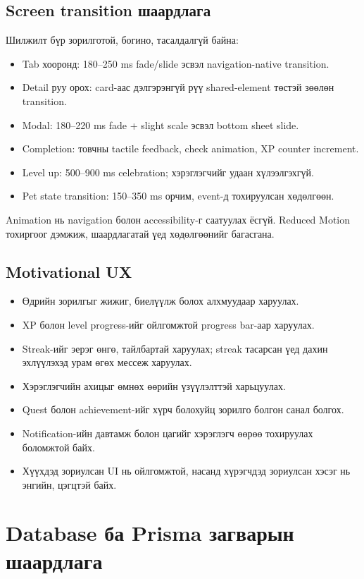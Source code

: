 \documentclass[12pt,a4paper,oneside]{report}
\begin{document}
\section{Screen transition шаардлага}
Шилжилт бүр зорилготой, богино, тасалдалгүй байна:
\begin{itemize}
  \item Tab хооронд: 180--250 ms fade/slide эсвэл navigation-native transition.
  \item Detail руу орох: card-аас дэлгэрэнгүй рүү shared-element төстэй зөөлөн transition.
  \item Modal: 180--220 ms fade + slight scale эсвэл bottom sheet slide.
  \item Completion: товчны tactile feedback, check animation, XP counter increment.
  \item Level up: 500--900 ms celebration; хэрэглэгчийг удаан хүлээлгэхгүй.
  \item Pet state transition: 150--350 ms орчим, event-д тохируулсан хөдөлгөөн.
\end{itemize}
Animation нь navigation болон accessibility-г саатуулах ёсгүй. Reduced Motion тохиргоог дэмжиж, шаардлагатай үед хөдөлгөөнийг багасгана.

\section{Motivational UX}
\begin{itemize}
  \item Өдрийн зорилгыг жижиг, биелүүлж болох алхмуудаар харуулах.
  \item XP болон level progress-ийг ойлгомжтой progress bar-аар харуулах.
  \item Streak-ийг эерэг өнгө, тайлбартай харуулах; streak тасарсан үед дахин эхлүүлэхэд урам өгөх мессеж харуулах.
  \item Хэрэглэгчийн ахицыг өмнөх өөрийн үзүүлэлттэй харьцуулах.
  \item Quest болон achievement-ийг хүрч болохуйц зорилго болгон санал болгох.
  \item Notification-ийн давтамж болон цагийг хэрэглэгч өөрөө тохируулах боломжтой байх.
  \item Хүүхдэд зориулсан UI нь ойлгомжтой, насанд хүрэгчдэд зориулсан хэсэг нь энгийн, цэгцтэй байх.
\end{itemize}

\chapter{Database ба Prisma загварын шаардлага}
\end{document}
